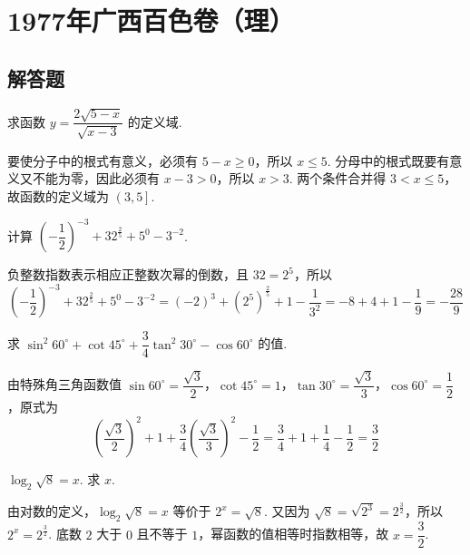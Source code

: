 \chapter{1977年广西百色卷（理）}

\section{解答题}

\begin{problem}
求函数 \(y=\dfrac{2\sqrt{5-x}}{\sqrt{x-3}}\) 的定义域.
\end{problem}

\begin{solution}
要使分子中的根式有意义，必须有 \(5-x\geqslant0\)，所以 \(x\leqslant5\). 分母中的根式既要有意义又不能为零，因此必须有 \(x-3>0\)，所以 \(x>3\). 两个条件合并得 \(3<x\leqslant5\)，故函数的定义域为 \(\left(3,5\right]\).
\end{solution}

\begin{problem}
计算 \(\left(-\dfrac{1}{2}\right)^{-3}+32^{\frac{2}{5}}+5^0-3^{-2}\).
\end{problem}

\begin{solution}
负整数指数表示相应正整数次幂的倒数，且 \(32=2^5\)，所以
\[
\left(-\dfrac{1}{2}\right)^{-3}+32^{\frac{2}{5}}+5^0-3^{-2}=(-2)^3+\left(2^5\right)^{\frac{2}{5}}+1-\dfrac{1}{3^2}=-8+4+1-\dfrac{1}{9}=-\dfrac{28}{9}
\]
\end{solution}

\begin{problem}
求 \(\sin^2 60^\circ+\cot45^\circ+\dfrac{3}{4}\tan^2 30^\circ-\cos60^\circ\) 的值.
\end{problem}

\begin{solution}
由特殊角三角函数值 \(\sin60^\circ=\dfrac{\sqrt3}{2}\)，\(\cot45^\circ=1\)，\(\tan30^\circ=\dfrac{\sqrt3}{3}\)，\(\cos60^\circ=\dfrac12\)，原式为
\[
\left(\dfrac{\sqrt3}{2}\right)^2+1+\dfrac34\left(\dfrac{\sqrt3}{3}\right)^2-\dfrac12=\dfrac34+1+\dfrac14-\dfrac12=\dfrac32
\]
\end{solution}

\begin{problem}
\(\log_2\sqrt8=x\). 求 \(x\).
\end{problem}

\begin{solution}
由对数的定义，\(\log_2\sqrt8=x\) 等价于 \(2^x=\sqrt8\). 又因为 \(\sqrt8=\sqrt{2^3}=2^{\frac32}\)，所以 \(2^x=2^{\frac32}\). 底数 \(2\) 大于 \(0\) 且不等于 \(1\)，幂函数的值相等时指数相等，故 \(x=\dfrac32\).
\end{solution}

